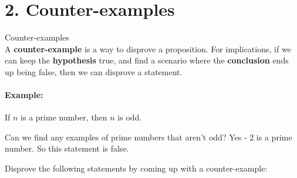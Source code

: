 \documentclass[a4paper,12pt]{book}
\newcounter{question}
\begin{document}
    \section*{2. Counter-examples}

        \begin{intro}{Counter-examples} ~\\
            A \textbf{counter-example} is a way to disprove a proposition.
            For implications, if we can keep the \textbf{hypothesis} true,
            and find a scenario where the \textbf{conclusion} ends up being false,
            then we can disprove a statement.

            \paragraph{Example:}
            If $n$ is a prime number, then $n$ is odd.

            Can we find any examples of prime numbers that aren't odd?
            Yes - 2 is a prime number. So this statement is false.
        \end{intro}

        \begin{questionNOGRADE}{\thequestion}
            Disprove the following statements by coming up with a counter-example:

        \end{questionNOGRADE}
\end{document}
